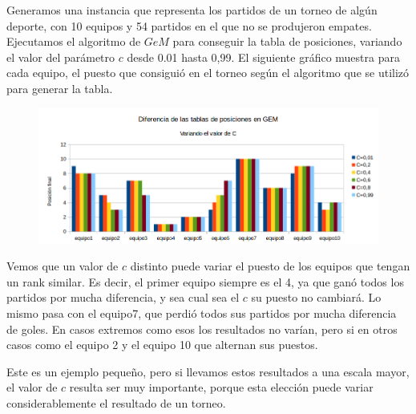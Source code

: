 Generamos una instancia que representa los partidos de un torneo de algún deporte, con 10 equipos y 54 partidos en el que no se produjeron empates. Ejecutamos el algoritmo de $GeM$ para conseguir la tabla de posiciones, variando el valor del parámetro $c$ desde 0.01 hasta 0,99. El siguiente gráfico muestra para cada equipo, el puesto que consiguió en el torneo según el algoritmo que se utilizó para generar la tabla.



\begin{figure}[H]
\centering
\includegraphics[width=0.6\linewidth]{imagenes/variacionDeTablaGEM.png}
\end{figure}


Vemos que un valor de $c$ distinto puede variar el puesto de los equipos que tengan un rank similar. Es decir, el primer equipo siempre es el 4, ya que ganó todos los partidos por mucha diferencia, y sea cual sea el $c$ su puesto no cambiará. Lo mismo pasa con el equipo7, que perdió todos sus partidos por mucha diferencia de goles. En casos extremos como esos los resultados no varían, pero si en otros casos como el equipo 2 y el equipo 10 que alternan sus puestos.

Este es un ejemplo pequeño, pero si llevamos estos resultados a una escala mayor, el valor de $c$ resulta ser muy importante, porque esta elección puede variar considerablemente el resultado de un torneo.
